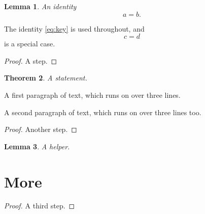 \documentclass{article}
\newtheorem{theorem}{Theorem}
\newtheorem{lemma}[theorem]{Lemma}
\begin{document}
\begin{lemma}\label{key}
An identity
\begin{equation}\label{eq:key}
a = b.
\end{equation}
\end{lemma}
The identity \eqref{eq:key} is used throughout, and
\begin{equation*}
c = d
\end{equation*}
is a special case.
\begin{proof}
A step.
\end{proof}
\begin{theorem}
A statement.
\end{theorem}
A first paragraph of text,
which runs on
over three lines.

A second paragraph of text,
which runs on
over three lines too.

\begin{proof}
Another step.
\end{proof}
\begin{lemma}
A helper.
\end{lemma}
\section{More}
\begin{proof}
A third step.
\end{proof}
\end{document}
